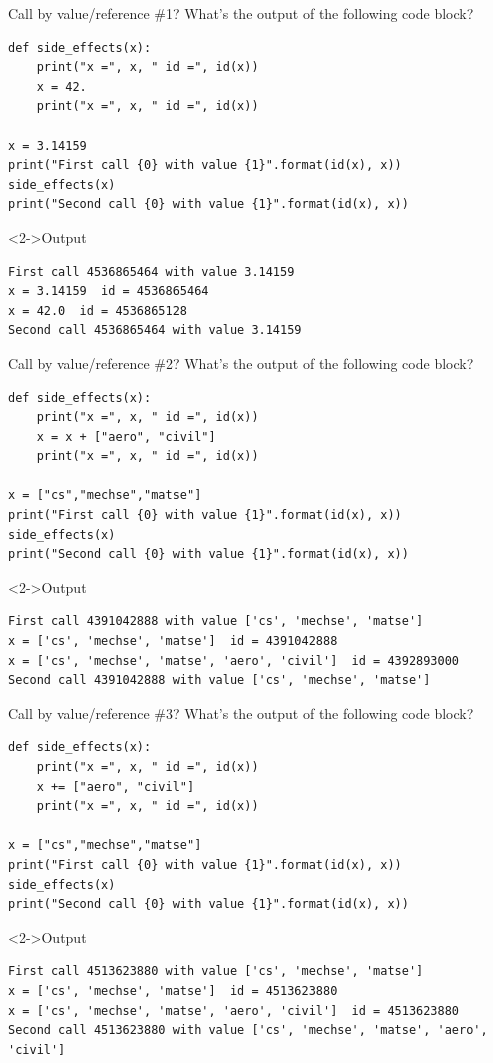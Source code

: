 \documentclass[presentation]{beamer}
\begin{document}
\begin{frame}[label={sec:org8907f85},fragile]{Call by value/reference \#1?}
 What's the output of the following code block?
\footnotesize
\begin{verbatim}
def side_effects(x):
    print("x =", x, " id =", id(x))
    x = 42.
    print("x =", x, " id =", id(x))

x = 3.14159
print("First call {0} with value {1}".format(id(x), x))
side_effects(x)
print("Second call {0} with value {1}".format(id(x), x))
\end{verbatim}
\begin{block}<2->{Output}
\footnotesize
\begin{verbatim}
First call 4536865464 with value 3.14159
x = 3.14159  id = 4536865464
x = 42.0  id = 4536865128
Second call 4536865464 with value 3.14159
\end{verbatim}
\end{block}
\end{frame}
\begin{frame}[label={sec:orgbd1bfbf},fragile]{Call by value/reference \#2?}
 What's the output of the following code block?
\footnotesize
\begin{verbatim}
def side_effects(x):
    print("x =", x, " id =", id(x))
    x = x + ["aero", "civil"]
    print("x =", x, " id =", id(x))

x = ["cs","mechse","matse"]
print("First call {0} with value {1}".format(id(x), x))
side_effects(x)
print("Second call {0} with value {1}".format(id(x), x))
\end{verbatim}
\begin{block}<2->{Output}
\scriptsize
\begin{verbatim}
First call 4391042888 with value ['cs', 'mechse', 'matse']
x = ['cs', 'mechse', 'matse']  id = 4391042888
x = ['cs', 'mechse', 'matse', 'aero', 'civil']  id = 4392893000
Second call 4391042888 with value ['cs', 'mechse', 'matse']
\end{verbatim}
\end{block}
\end{frame}
\begin{frame}[label={sec:org924c802},fragile]{Call by value/reference \#3?}
 What's the output of the following code block?
\footnotesize
\begin{verbatim}
def side_effects(x):
    print("x =", x, " id =", id(x))
    x += ["aero", "civil"]
    print("x =", x, " id =", id(x))

x = ["cs","mechse","matse"]
print("First call {0} with value {1}".format(id(x), x))
side_effects(x)
print("Second call {0} with value {1}".format(id(x), x))
\end{verbatim}
\begin{block}<2->{Output}
\scriptsize
\begin{verbatim}
First call 4513623880 with value ['cs', 'mechse', 'matse']
x = ['cs', 'mechse', 'matse']  id = 4513623880
x = ['cs', 'mechse', 'matse', 'aero', 'civil']  id = 4513623880
Second call 4513623880 with value ['cs', 'mechse', 'matse', 'aero', 'civil']
\end{verbatim}
\end{block}
\end{frame}
\end{document}
